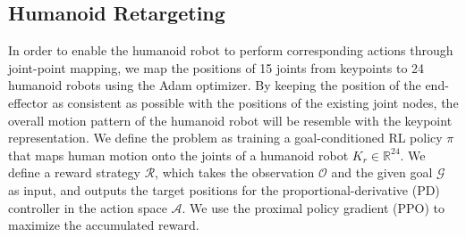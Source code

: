 \subsection{Humanoid Retargeting}
In order to enable the humanoid robot to perform corresponding actions through joint-point mapping, we map the positions of 15 joints from keypoints to 24 humanoid robots  using the Adam optimizer. By keeping the position of the end-effector as consistent as possible with the positions of the existing joint nodes, the overall motion pattern of the humanoid robot will be resemble with the keypoint representation.
We define the problem as training a goal-conditioned RL policy $\pi$ that maps human motion onto the joints of a humanoid robot $K_r\in \mathbb{R}^{24}$. We define a reward strategy $\mathcal{R}$, which takes the observation $\mathcal{O}$  and the given goal $\mathcal{G}$ as input, and outputs the target positions for the proportional-derivative (PD) controller in the action space $\mathcal{A}$. We use the proximal policy gradient (PPO) to maximize the accumulated reward.
